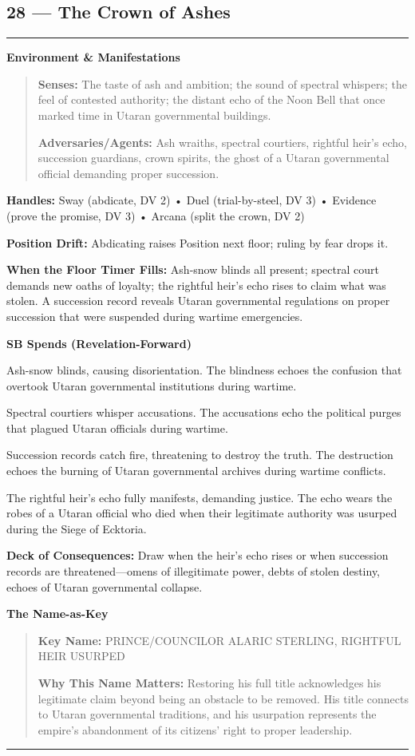 \documentclass[18pt, letterpaper, twoside]{article}
\newenvironment{floorbox}[1]{%
    \begin{center}
    \begin{minipage}{0.95\textwidth}
    \subsection*{#1}
    \vspace{-0.5em}
    \rule{\textwidth}{0.5pt}
    \vspace{0.5em}
}{%
    \vspace{0.5em}
    \rule{\textwidth}{0.5pt}
    \end{minipage}
    \end{center}
}
\newenvironment{gmnote}[1]{%
    \vspace{0.5em}
    \noindent\textbf{#1}
    \begin{quote}
}{%
    \end{quote}
    \vspace{0.5em}
}
\newcommand{\handles}[1]{\noindent\textbf{Handles:} #1\par}
\newcommand{\sbitem}[2]{\item[#1 SB:] #2}
\newcommand{\deckdraw}[1]{\noindent\textbf{Deck of Consequences:} #1\par}
\newcommand{\keyname}[1]{\noindent\textbf{Key Name:} #1\par}
\newcommand{\nameimportance}[1]{\noindent\textbf{Why This Name Matters:} #1\par}
\begin{document}
\begin{floorbox}{28 --- The Crown of Ashes}
\begin{gmnote}{Environment \& Manifestations}
\textbf{Senses:} The taste of ash and ambition; the sound of spectral whispers; the feel of contested authority; the distant echo of the Noon Bell that once marked time in Utaran governmental buildings.

\textbf{Adversaries/Agents:} Ash wraiths, spectral courtiers, rightful heir's echo, succession guardians, crown spirits, the ghost of a Utaran governmental official demanding proper succession.
\end{gmnote}

\handles{Sway (abdicate, DV 2) • Duel (trial-by-steel, DV 3) • Evidence (prove the promise, DV 3) • Arcana (split the crown, DV 2)}

\textbf{Position Drift:} Abdicating raises Position next floor; ruling by fear drops it.

\textbf{When the Floor Timer Fills:} Ash-snow blinds all present; spectral court demands new oaths of loyalty; the rightful heir's echo rises to claim what was stolen. A succession record reveals Utaran governmental regulations on proper succession that were suspended during wartime emergencies.

\textbf{SB Spends (Revelation-Forward)}
\begin{description}[leftmargin=*, style=unboxed]
    \sbitem{1}{Ash-snow blinds, causing disorientation. The blindness echoes the confusion that overtook Utaran governmental institutions during wartime.}
    \sbitem{2}{Spectral courtiers whisper accusations. The accusations echo the political purges that plagued Utaran officials during wartime.}
    \sbitem{3}{Succession records catch fire, threatening to destroy the truth. The destruction echoes the burning of Utaran governmental archives during wartime conflicts.}
    \sbitem{4+}{The rightful heir's echo fully manifests, demanding justice. The echo wears the robes of a Utaran official who died when their legitimate authority was usurped during the Siege of Ecktoria.}
\end{description}

\deckdraw{Draw when the heir's echo rises or when succession records are threatened---omens of illegitimate power, debts of stolen destiny, echoes of Utaran governmental collapse.}

\begin{gmnote}{The Name-as-Key}
\keyname{PRINCE/COUNCILOR ALARIC STERLING, RIGHTFUL HEIR USURPED}
\nameimportance{Restoring his full title acknowledges his legitimate claim beyond being an obstacle to be removed. His title connects to Utaran governmental traditions, and his usurpation represents the empire's abandonment of its citizens' right to proper leadership.}


\end{gmnote}
\end{floorbox}
\end{document}
